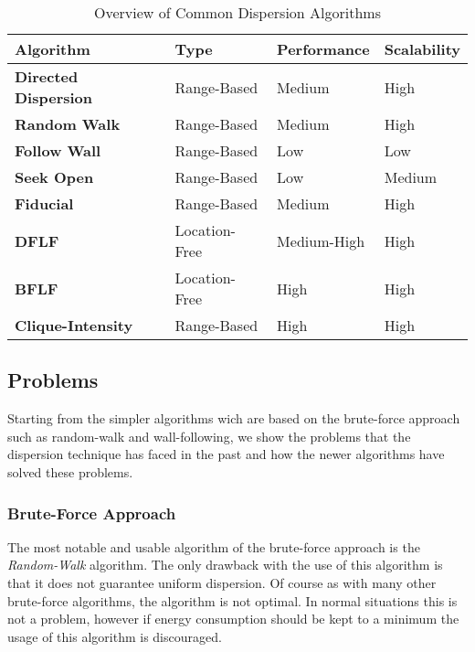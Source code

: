   \begin{table}[H]
  \renewcommand{\arraystretch}{1.3}
  \caption{Overview of Common Dispersion Algorithms}
  \label{table_alg_dispersion}
  \centering
    \begin{tabular}{|l|l|l|l|}
    \hline
    \bfseries Algorithm & \bfseries Type & \bfseries Performance & \bfseries Scalability\\
    \hline
    \bfseries Directed Dispersion & Range-Based & Medium & High\\\hline
    \bfseries Random Walk& Range-Based & Medium & High\\\hline
    \bfseries Follow Wall& Range-Based & Low & Low\\\hline
    \bfseries Seek Open& Range-Based & Low & Medium\\\hline
    \bfseries Fiducial& Range-Based & Medium & High\\\hline
    \bfseries DFLF& Location-Free & Medium-High & High\\\hline
    \bfseries BFLF & Location-Free & High & High\\\hline
    \bfseries Clique-Intensity& Range-Based & High & High\\\hline
    \end{tabular}
  \end{table}

  \subsection{Problems}
Starting from the simpler algorithms wich are based on the brute-force approach such as random-walk and wall-following, we show the problems that the dispersion technique has faced in the past and how the newer algorithms have solved these problems.

\subsubsection{Brute-Force Approach}
The most notable and usable  algorithm of the brute-force approach is the \emph{Random-Walk} algorithm. 
The only drawback with the use of this algorithm is that it does not guarantee uniform dispersion.
Of course as with many other brute-force algorithms, the algorithm is not optimal.
In normal situations this is not a problem, however if energy consumption should be kept to a minimum the usage of this algorithm is discouraged.

